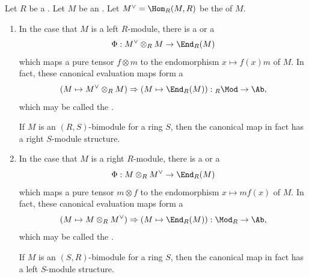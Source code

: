\begin{definition} \label{definition:canonical_evaluation_map_for_a_module_over_a_ring}
    Let $R$ be a . Let $M$ be an . Let $M^\vee = \Hom_R(M,R)$ be the  of $M$. 
    \begin{enumerate}
        \item In the case that $M$ is a left $R$-module, there is a  or a 
        $$\Phi: M^\vee \otimes_R M \to \End_R(M)$$
        which maps a pure tensor $f \otimes m$ to the endomorphism $x \mapsto f(x) m$ of $M$. In fact, these canonical evaluation maps form a 
        $$(M \mapsto M^\vee \otimes_R M) \Rightarrow (M \mapsto \End_R(M)): {}_R \Mod \to \Ab,$$
         which may be called the .

        If $M$ is an $(R,S)$-bimodule for a ring $S$, then the canonical map in fact has a right $S$-module structure.

        \item In the case that $M$ is a right $R$-module, there is a  or a 
        $$\Phi: M \otimes_R M^\vee \to \End_R(M)$$
        which maps a pure tensor $m \otimes f$ to the endomorphism $x \mapsto m f(x) $ of $M$.
        In fact, these canonical evaluation maps form a 
        $$(M \mapsto M \otimes_R M^\vee) \Rightarrow (M \mapsto \End_R(M)): {} \Mod_R \to \Ab,$$
        which may be called the .

        If $M$ is an $(S,R)$-bimodule for a ring $S$, then the canonical map in fact has a left $S$-module structure.
    \end{enumerate}
\end{definition}